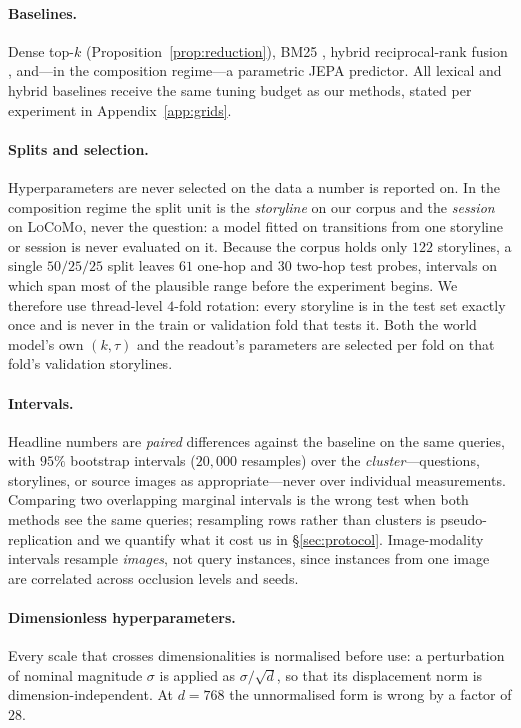 \paragraph{Baselines.} Dense top-$k$ (Proposition~\ref{prop:reduction}), BM25
\citep{robertson2009bm25}, hybrid reciprocal-rank fusion \citep{cormack2009rrf}, and---in the
composition regime---a parametric JEPA predictor. All lexical and hybrid baselines receive
the same tuning budget as our methods, stated per experiment in Appendix~\ref{app:grids}.

\paragraph{Splits and selection.} Hyperparameters are never selected on the data a number is
reported on. In the composition regime the split unit is the \emph{storyline} on our corpus
and the \emph{session} on \textsc{LoCoMo}, never the question: a model fitted on transitions
from one storyline or session is never evaluated on it. Because the corpus holds only $122$ storylines, a single $50/25/25$ split leaves
$61$ one-hop and $30$ two-hop test probes, intervals on which span most of the plausible
range before the experiment begins. We therefore use thread-level $4$-fold rotation: every
storyline is in the test set exactly once and is never in the train or validation fold that
tests it. Both the world model's own $(k,\tau)$ and the readout's parameters are selected
per fold on that fold's validation storylines.

\paragraph{Intervals.} Headline numbers are \emph{paired} differences against the baseline on
the same queries, with $95\%$ bootstrap intervals ($20{,}000$ resamples) over the
\emph{cluster}---questions, storylines, or source images as appropriate---never over
individual measurements. Comparing two overlapping marginal intervals is the wrong test when
both methods see the same queries; resampling rows rather than clusters is pseudo-replication
and we quantify what it cost us in \S\ref{sec:protocol}. Image-modality intervals resample
\emph{images}, not query instances, since instances from one image are correlated across
occlusion levels and seeds.

\paragraph{Dimensionless hyperparameters.} Every scale that crosses dimensionalities is
normalised before use: a perturbation of nominal magnitude $\sigma$ is applied as
$\sigma/\sqrt{d}$, so that its displacement norm is dimension-independent. At $d{=}768$ the
unnormalised form is wrong by a factor of $28$.

